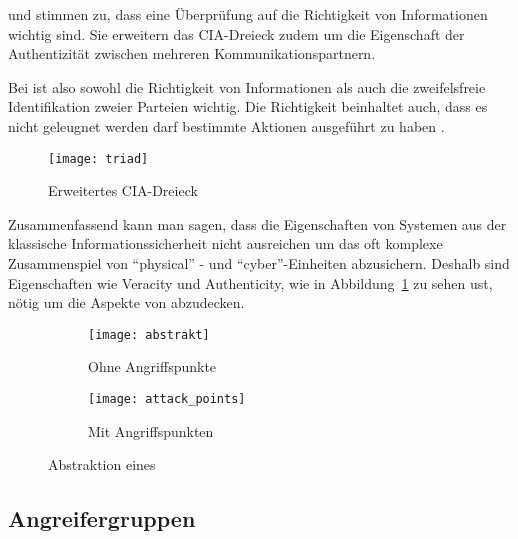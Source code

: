 \citeauthor{WYX+10} und \citeauthor{SFJ2017} stimmen zu, dass eine Überprüfung auf die Richtigkeit von Informationen wichtig sind.
Sie erweitern das CIA-Dreieck zudem um die Eigenschaft der Authentizität zwischen mehreren Kommunikationspartnern.

Bei \cps ist also sowohl die Richtigkeit von Informationen als auch die zweifelsfreie Identifikation zweier Parteien wichtig.
Die Richtigkeit beinhaltet auch, dass es nicht geleugnet werden darf bestimmte Aktionen ausgeführt zu haben \cite{NIST2013}.

\begin{figure}
    \centering
    \texttt{[image: triad]}
    \caption{Erweitertes CIA-Dreieck}
    \label{fig:triad}
\end{figure}

Zusammenfassend kann man sagen, dass die Eigenschaften von Systemen aus der klassische Informationssicherheit nicht ausreichen um das oft komplexe Zusammenspiel von \enquote{physical} - und \enquote{cyber}-Einheiten abzusichern.
Deshalb sind Eigenschaften wie Veracity und Authenticity, wie in Abbildung~\ref{fig:triad} zu sehen ust, nötig um die Aspekte von \cps abzudecken.


\begin{figure}
    \centering
    \begin{subfigure}[b]{0.3\textwidth}
        \texttt{[image: abstrakt]}
        \caption{Ohne Angriffspunkte}
        \label{fig:abstrakt}
    \end{subfigure}
    \qquad
    \begin{subfigure}[b]{0.3\textwidth}
        \texttt{[image: attack\_points]}
        \caption{Mit Angriffspunkten}
        \label{fig:attack_points}
    \end{subfigure}
    \caption{Abstraktion eines \cps~\cite{CAS08}}
\end{figure}


\subsection{Angreifergruppen}\label{subsec:angreifergruppen}

